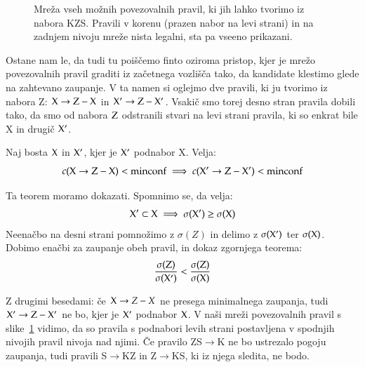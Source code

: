 \begin{figure}[htbp]
\caption{Mreža vseh možnih povezovalnih pravil, ki jih lahko tvorimo iz nabora KZS. Pravili v korenu (prazen nabor na levi strani) in na zadnjem nivoju mreže nista legalni, sta pa vseeno prikazani.}
\label{f:pravila-kzs}
\end{figure}

Ostane nam le, da tudi tu poiščemo finto oziroma pristop, kjer je mrežo povezovalnih pravil graditi iz začetnega vozlišča tako, da kandidate klestimo glede na zahtevano zaupanje. V ta namen si oglejmo dve pravili, ki ju tvorimo iz nabora Z: ${\rm X}\to {\rm Z}-{\rm X}$ in ${\rm X'}\to {\rm Z}-{\rm X}'$. Vsakič smo torej desno stran pravila dobili tako, da smo od nabora ${\rm Z}$ odstranili stvari na levi strani pravila, ki so enkrat bile X in drugič ${\rm X}'$.

\begin{teorem}
  Naj bosta ${\rm X}$ in ${\rm X}'$, kjer je ${\rm X}'$ podnabor {\rm X}. Velja:
  $$c({\rm X}\to {\rm Z}-{\rm X})<{\rm minconf}\implies c({\rm X}'\to {\rm Z}-{\rm X}')<{\rm minconf} $$
\end{teorem}
Ta teorem moramo dokazati. Spomnimo se, da velja:
$$ {\rm X}'\subset {\rm X}\implies\sigma({\rm X}')\geq\sigma({\rm X}) $$
Neenačbo na desni strani pomnožimo z $\sigma(Z)$ in delimo z $\sigma({\rm X}')$ ter $\sigma({\rm X})$. Dobimo enačbi za zaupanje obeh pravil, in dokaz zgornjega teorema:
$${\sigma({\rm Z})\over\sigma({\rm X}')} < {\sigma({\rm Z})\over\sigma({\rm X})}$$

Z drugimi besedami: če ${\rm X}\to Z-X$ ne presega minimalnega zaupanja, tudi ${\rm X'}\to {\rm Z}-{\rm X}'$ ne bo, kjer je ${\rm X}'$ podnabor ${\rm X}$. V naši mreži povezovalnih pravil s slike~\ref{f:pravila-kzs} vidimo, da so pravila s podnabori levih strani postavljena v spodnjih nivojih pravil nivoja nad njimi. Če pravilo ZS$\to$K ne bo ustrezalo pogoju zaupanja, tudi pravili S$\to$KZ in Z$\to$KS, ki iz njega sledita, ne bodo.

